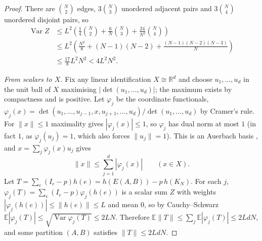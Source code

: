 \documentclass[11pt,a4paper]{article}
\theoremstyle{plain}
\theoremstyle{definition}
\theoremstyle{remark}
\newcommand{\R}{\mathbb R}
\newcommand{\E}{\mathbb E}
\newcommand{\Var}{\operatorname{Var}}
\begin{document}
\begin{proof}
There are $\binom N2$ edges, $3\binom N3$ unordered adjacent pairs and $3\binom N4$ unordered disjoint pairs, so
\begin{align*}
\Var Z
&\le L^2\left(\frac14\binom N2+\frac6N\binom N3
       +\frac{24}{N^2}\binom N4\right)\\
&\le L^2\left(\frac{N^2}8+(N-1)(N-2)
       +\frac{(N-1)(N-2)(N-3)}N\right)\\
&\le\frac{17}8L^2N^2<4L^2N^2 .
\end{align*}

\emph{From scalars to $X$.} Fix any linear identification $X\cong\R^d$ and choose $u_1,\dots,u_d$ in the unit ball of $X$ maximising $|\det(u_1,\dots,u_d)|$; the maximum exists by compactness and is positive. Let $\varphi_j$ be the coordinate functionals, $\varphi_j(x)=\det(u_1,\dots,u_{j-1},x,u_{j+1},\dots,u_d)/\det(u_1,\dots,u_d)$ by Cramer's rule. For $\|x\|\le1$ maximality gives $|\varphi_j(x)|\le1$, so $\varphi_j$ has dual norm at most $1$ (in fact $1$, as $\varphi_j(u_j)=1$, which also forces $\|u_j\|=1$). This is an Auerbach basis \cite[Prop.~1.c.3]{LT77}, and $x=\sum_j\varphi_j(x)u_j$ gives
\[
 \|x\|\le\sum_{j=1}^d|\varphi_j(x)|\qquad(x\in X).
\]
Let $T=\sum_e(I_e-p)h(e)=h(E(A,B))-p\,h(K_N)$. For each $j$, $\varphi_j(T)=\sum_e(I_e-p)\varphi_j(h(e))$ is a scalar sum $Z$ with weights $|\varphi_j(h(e))|\le\|h(e)\|\le L$ and mean $0$, so by Cauchy--Schwarz $\E|\varphi_j(T)|\le\sqrt{\Var\varphi_j(T)}\le2LN$. Therefore $\E\|T\|\le\sum_j\E|\varphi_j(T)|\le2LdN$, and some partition $(A,B)$ satisfies $\|T\|\le2LdN$.
\end{proof}
\end{document}
